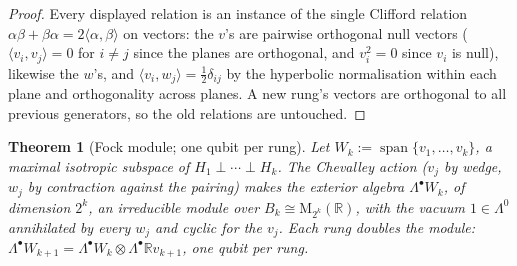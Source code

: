 \documentclass[11pt]{article}
\newtheorem{theorem}{Theorem}[section]
\theoremstyle{definition}
\newcommand{\R}{\mathbb{R}}
\newcommand{\Mat}{\mathrm{M}}
\begin{document}
\begin{proof}
Every displayed relation is an instance of the single Clifford relation $\alpha\beta + \beta\alpha = 2\langle\alpha, \beta\rangle$ on vectors: the $v$'s are pairwise orthogonal null vectors ($\langle v_i, v_j \rangle = 0$ for $i \neq j$ since the planes are orthogonal, and $v_i^2 = 0$ since $v_i$ is null), likewise the $w$'s, and $\langle v_i, w_j \rangle = \tfrac12\delta_{ij}$ by the hyperbolic normalisation within each plane and orthogonality across planes. A new rung's vectors are orthogonal to all previous generators, so the old relations are untouched.
\end{proof}

\begin{theorem}[Fock module; one qubit per rung]\label{thm:fock}
Let $W_k := \operatorname{span}\{v_1, \dots, v_k\}$, a maximal isotropic subspace of $H_1 \perp \cdots \perp H_k$. The Chevalley action ($v_j$ by wedge, $w_j$ by contraction against the pairing) makes the exterior algebra $\Lambda^\bullet W_k$, of dimension $2^k$, an irreducible module over $B_k \cong \Mat_{2^k}(\R)$, with the vacuum $1 \in \Lambda^0$ annihilated by every $w_j$ and cyclic for the $v_j$. Each rung doubles the module: $\Lambda^\bullet W_{k+1} = \Lambda^\bullet W_k \otimes \Lambda^\bullet \R v_{k+1}$, one qubit per rung.
\end{theorem}
\end{document}
